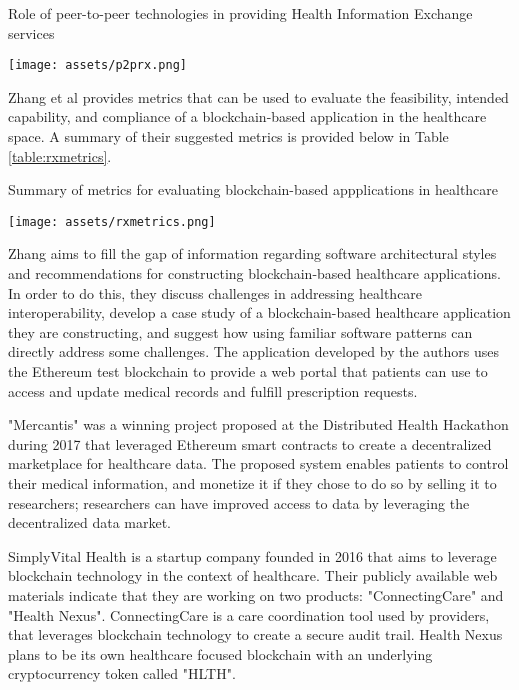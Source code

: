 \documentclass[12pt]{report}
\begin{document}
\begin{table}[h!]
\caption{Role of peer-to-peer technologies in providing Health Information Exchange services \cite{Dufel.2016}}
\texttt{[image: assets/p2prx.png]}
\label{table:p2prx}
\end{table}

Zhang et al \cite{PengZhangMichaelWalkerJulesWhiteDouglasC.Schmidt.2017} provides metrics that can be used to evaluate the feasibility, intended capability, and compliance of a blockchain-based application in the healthcare space. A summary of their suggested metrics is provided below in Table \ref{table:rxmetrics}.

\begin{table}[h!]
\begin{center}
\caption{Summary of metrics for evaluating blockchain-based appplications in healthcare \cite{PengZhangMichaelWalkerJulesWhiteDouglasC.Schmidt.2017}}
\texttt{[image: assets/rxmetrics.png]}
\label{table:rxmetrics}
\end{center}
\end{table}

Zhang \cite{PengZhang.} aims to fill the gap of information regarding software architectural styles and recommendations for constructing blockchain-based healthcare applications. In order to do this, they discuss challenges in addressing healthcare interoperability, develop a case study of a blockchain-based healthcare application they are constructing, and suggest how using familiar software patterns can directly address some challenges. The application developed by the authors uses the Ethereum test blockchain to provide a web portal that patients can use to access and update medical records and fulfill prescription requests.

"Mercantis" \cite{.b} was a winning project proposed at the Distributed Health Hackathon during 2017 that leveraged Ethereum smart contracts to create a decentralized marketplace for healthcare data. The proposed system enables patients to control their medical information, and monetize it if they chose to do so by selling it to researchers; researchers can have improved access to data by leveraging the decentralized data market.

SimplyVital Health \cite{SVH.} is a startup company founded in 2016 that aims to leverage blockchain technology in the context of healthcare. Their publicly available web materials indicate that they are working on two products: "ConnectingCare" and "Health Nexus". ConnectingCare is a care coordination tool used by providers, that leverages blockchain technology to create a secure audit trail. Health Nexus plans to be its own healthcare focused blockchain with an underlying cryptocurrency token called "HLTH".
\end{document}
